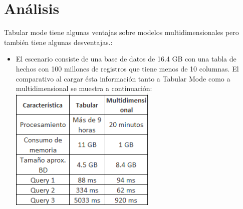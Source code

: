 \documentclass[twoside,twocolumn]{article}
\begin{document}
\section{Análisis}
Tabular mode tiene algunas ventajas sobre modelos multidimensionales pero también tiene algunas desventajas.:\\
\begin{itemize}
 \item El escenario consiste de una base de datos de 16.4 GB con una tabla de hechos con 100 millones de registros que tiene menos de 10 columnas. El comparativo al cargar ésta información tanto a Tabular Mode como a multidimensional se muestra a continuación:\\
\includegraphics[width=7cm]{Imagenes/3.png}
\textbf{ {\small}}
\\ \\



\end{itemize} 



\end{document}
